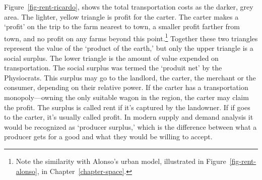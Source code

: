 Figure~\ref{fig-rent-ricardo}, shows the total transportation costs as the darker, grey area. The lighter,  yellow triangle is profit for the carter. The carter makes a `profit' on the trip to the farm nearest to town, a smaller profit farther from town, and no profit on any farms beyond this point.\footnote{Note the similarity with Alonso's urban model, illustrated in Figure~\ref{fig-rent-alonso}, in Chapter~\ref{chapter-space}.} 
Together these two triangles represent the  value of the `product of the earth,' but only the upper triangle is a social \gls{surplus}. The lower triangle is the amount of value expended on transportation. The social surplus was termed the `\gls{produit net}' by the Physiocrats. This surplus may go to the landlord, the carter, the merchant or the consumer, depending %
on their relative power. 
If the carter has a transportation monopoly---owning the only suitable wagon in the region, the carter may claim the profit. The surplus is called rent if it's captured by the landowner. If if goes to the carter, it's usually called profit. In modern supply and demand analysis it would be recognized as `\gls{producer surplus},' which is the difference between what a producer gets for a good and what they would be willing to accept. 



